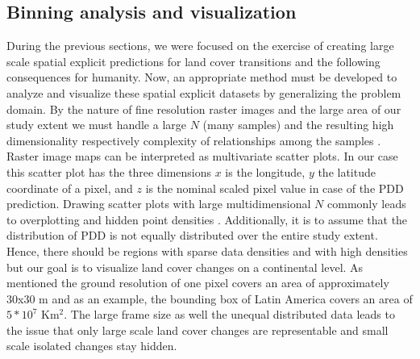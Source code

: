 	\subsection{Binning analysis and visualization}
	\label{subsec:methods_binning}
		During the previous sections, we were focused on the exercise of creating large scale spatial explicit predictions for land cover transitions and the following consequences for humanity. Now, an appropriate method must be developed to analyze and visualize these spatial explicit datasets by generalizing the problem domain. By the nature of fine resolution raster images and the large area of our study extent we must handle a large $N$ (many samples) and the resulting high dimensionality respectively complexity of relationships among the samples \citep{Carr1990}. Raster image maps can be interpreted as multivariate scatter plots. In our case this scatter plot has the three dimensions $x$ is the longitude, $y$ the latitude coordinate of a pixel, and $z$ is the nominal scaled pixel value in case of the \ac{PDD} prediction. Drawing scatter plots with large multidimensional $N$ commonly leads to overplotting and hidden point densities \citep{Carr1987}. Additionally, it is to assume that the distribution of \ac{PDD} is not equally distributed over the entire study extent. Hence, there should be regions with sparse data densities and with high densities but our goal is to visualize land cover changes on a continental level. As mentioned the ground resolution of one pixel covers an area of approximately 30x30 m and as an example, the bounding box of Latin America covers an area of $5*10^7$ Km$^2$. The large frame size as well the unequal distributed data leads to the issue that only large scale land cover changes are representable and small scale isolated changes stay hidden.

